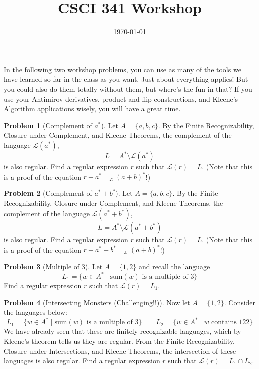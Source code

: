 \documentclass[11pt]{article}
\title{CSCI 341 Workshop \wshop}
\author{\subtitle}
\date{
    \today
}
\theoremstyle{theorem} %
\theoremstyle{definition} %
\newtheorem{problem}                    {{\color{BurntOrange}Problem}}
\theoremstyle{remark} %
\begin{document}
\maketitle


In the following two workshop problems, you can use as many of the tools we have learned so far in the class as you want.
Just about everything applies!
But you could also do them totally without them, but where's the fun in that?
If you use your Antimirov derivatives, product and flip constructions, and Kleene's Algorithm applications wisely, you will have a great time.

\begin{problem}[Complement of \(a^*\)]
    Let \(A = \{a, b, c\}\).
    By the Finite Recognizability, Closure under Complement, and Kleene Theorems, the complement of the language \(\mathcal L(a^*)\), 
    \[
        L = A^* \setminus \mathcal L(a^*)
    \]
    is also regular. 
    Find a regular expression \(r\) such that \(\mathcal L(r) = L\).
    (Note that this is a proof of the equation \(r + a^* =_{\mathcal L} (a + b)^*\)!)
\end{problem}

\pagebreak

\begin{problem}[Complement of \(a^* + b^*\)]
    Let \(A = \{a, b, c\}\).
    By the Finite Recognizability, Closure under Complement, and Kleene Theorems, the complement of the language \(\mathcal L(a^* + b^*)\), 
    \[
        L = A^* \setminus \mathcal L(a^* + b^*)
    \]
    is also regular. 
    Find a regular expression \(r\) such that \(\mathcal L(r) = L\).
    (Note that this is a proof of the equation \(r + a^* + b^* =_{\mathcal L} (a + b)^*\)!)
\end{problem}

\pagebreak

\begin{problem}[Multiple of 3]
    Let \(A = \{1, 2\}\) and recall the language 
    \[
    L_1 = \{w \in A^* \mid \mathrm{sum}(w) \text{ is a multiple of \(3\)}\}
    \]
    Find a regular expression \(r\) such that \(\mathcal L(r) = L_1\).
\end{problem}

\pagebreak

\begin{problem}[Intersecting Monsters (Challenging!!)]
    Now let \(A = \{1, 2\}\). 
    Consider the languages below:
    \[
        L_1 = \{w \in A^* \mid \mathrm{sum}(w) \text{ is a multiple of \(3\)}\}
        \qquad
        L_2 = \{w \in A^* \mid w \text{ contains } 122\}
    \]
    We have already seen that these are finitely recognizable languages, which by Kleene's theorem tells us they are regular.
    From the Finite Recognizability, Closure under Intersections, and Kleene Theorems, the intersection of these languages is also regular.
    Find a regular expression \(r\) such that 
    \(
        \mathcal L(r) = L_1 \cap L_2
    \).
\end{problem}
\end{document}
